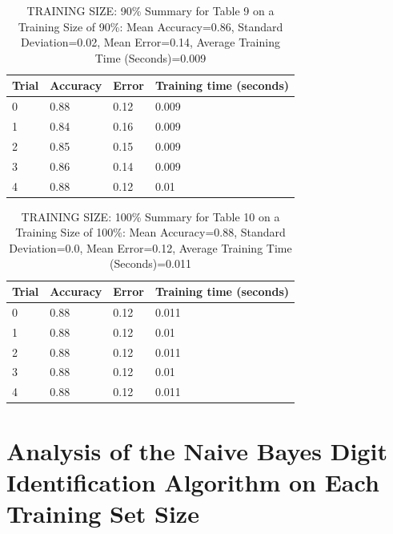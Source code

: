 \documentclass{article}
\begin{document}
\begin{table}[H]

\centering
{\begin{tabular}{||p{1cm}|p{1.8cm}|p{1.8cm}|p{3cm}||}
 \hline
Trial & Accuracy & Error & Training time (seconds) \\ [0.5ex] 
 \hline\hline
   0  & 0.88  & 0.12  & 0.009\\
\hline
   1  & 0.84  & 0.16  & 0.009\\
\hline
   2  & 0.85  & 0.15  & 0.009\\
\hline
   3  & 0.86  & 0.14  & 0.009\\
\hline
   4  & 0.88  & 0.12  & 0.01\\
 \hline
\end{tabular}}
\caption{TRAINING SIZE: 90\% \newline Summary for Table 9 on a Training Size of 90\%: Mean Accuracy=0.86, Standard Deviation=0.02, Mean Error=0.14, Average Training Time (Seconds)=0.009}
\end{table} 

\begin{table}[H]

\centering
{\begin{tabular}{||p{1cm}|p{1.8cm}|p{1.8cm}|p{3cm}||}
 \hline
Trial & Accuracy & Error & Training time (seconds) \\ [0.5ex] 
 \hline\hline
   0  & 0.88  & 0.12  & 0.011\\
\hline
   1  & 0.88  & 0.12  & 0.01\\
\hline
   2  & 0.88  & 0.12  & 0.011\\
\hline
   3  & 0.88  & 0.12  & 0.01\\
\hline
   4  & 0.88  & 0.12  & 0.011\\
 \hline
\end{tabular}}
\caption{TRAINING SIZE: 100\% \newline Summary for Table 10 on a Training Size of 100\%: Mean Accuracy=0.88, Standard Deviation=0.0, Mean Error=0.12, Average Training Time (Seconds)=0.011}
\end{table} 


\section{Analysis of the Naive Bayes Digit Identification Algorithm on Each Training Set Size}
\end{document}
